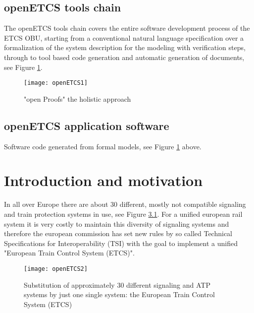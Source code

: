 \documentclass{template/openetcs_report}
\begin{document}

\section{openETCS tools chain}
The openETCS tools chain covers the entire software development process of the ETCS OBU,
starting from a conventional natural language specification over a formalization of the system
description for the modeling with verification steps, through to tool based code generation
and automatic generation of documents, see Figure \ref{fig:openETCS1}.

\begin{figure}
  \centering
  \texttt{[image: openETCS1]}
  \caption{"open Proofs" the holistic approach}
  \label{fig:openETCS1}
\end{figure}


\section{openETCS application software}
Software code generated from formal models, see Figure \ref{fig:openETCS1} above.


\chapter{Introduction and motivation}
In all over Europe there are about 30 different, mostly not compatible signaling and train protection systems in use, see Figure \ref{fig:openETCS2}. For a unified european rail system it is very costly to maintain this diversity of signaling systems and therefore the european commission has set new rules by so called Technical Specifications for Interoperability (TSI) with the goal to implement a unified "European Train Control System (ETCS)".


\begin{figure}
\centering
\texttt{[image: openETCS2]}
\caption{Substitution of approximately 30 different signaling and ATP systems by just one single system: the European Train Control System (ETCS)}
\label{fig:openETCS2}
\end{figure}
\end{document}

